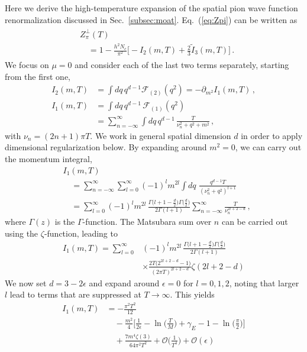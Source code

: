 \documentclass[reprint,english,superscriptaddress,preprintnumbers,amsmath,amssymb,aps,prd]{revtex4-2}
\def\Eq#1{Eq.~(\ref{#1})}
\def\Sec#1{Sec.~\ref{#1}}
\begin{document}
Here we derive the high-temperature expansion of the spatial pion wave function renormalization discussed in \Sec{subsec:moat}. \Eq{eq:Zpi} can be written as
%
\begin{align}
\begin{split}
&Z^\perp_\pi(T)\\[2ex]
&\quad =1-\frac{h^2N_c}{\pi^2}\bigg[-I_2(m,T)+\frac{2}{3}\tilde I_3(m,T)\bigg]
\,.
\label{eq:ZpiA}
\end{split}
\end{align}
%
We focus on $\mu=0$ and consider each of the last two terms separately, starting from the first one,
\begin{align}
 I_2(m,T) &= \int\! dq\,q^{d-1} \mathcal{F}_{(2)}(q^2) =  -\partial_{m^2} I_1(m,T)\,,\nonumber\\[2ex]
    I_1(m,T) &= \int\!dq\,q^{d-1}\,\mathcal{F}_{(1)}(q^2)\nonumber\\[2ex]
    &= \sum_{n=-\infty}^\infty \int\!dq\,q^{d-1}\, \frac{T}{\nu_n^2+q^2+m^2}\,,
    \label{eq:I2}
\end{align}
with $\nu_n = (2 n +1)\pi T$.
We work in general spatial dimension $d$ in order to apply dimensional regularization below. By expanding around $m^2 = 0$, we can carry out the momentum integral,
\begin{align}
    &I_1(m,T)\nonumber\\[2ex]
    &\quad= \sum_{n=-\infty}^\infty \sum_{l=0}^\infty (-1)^l m^{2l} \int\!dq\, \, \frac{q^{d-1} T}{(\nu_n^2+q^2)^{l+1}}\nonumber\\[2ex]
    &\quad=\sum_{l=0}^\infty (-1)^l m^{2l}\, \frac{\Gamma\big(l\!+\!1-\!\frac{d}{2}\big)\Gamma\big(\frac{d}{2}\big)}{2 \Gamma(l+1)}\! \sum_{n=-\infty}^\infty  \frac{T}{\nu_n^{2l+2-d}}\,,
\end{align}
where $\Gamma(z)$ is the $\Gamma$-function. The Matsubara sum over $n$ can be carried out using the $\zeta$-function, leading to
\begin{align}
  I_1(m,T) = \sum_{l=0}^\infty& (-1)^l m^{2l}\, \frac{\Gamma\big(l\!+\!1-\!\frac{d}{2}\big)\Gamma\big(\frac{d}{2}\big)}{2 \Gamma(l+1)}\nonumber\\[2ex]
  &\times\frac{2 T \big(2^{2l+2-d}-1\big)}{(2\pi T)^{2l+2-d}}\zeta(2l+2-d)
\end{align}
We now set $d=3-2\epsilon$ and expand around $\epsilon = 0$ for $l= 0,1,2$, noting that larger $l$ lead to terms that are suppressed at $T\rightarrow\infty$. This yields
\begin{align}
   I_1(m,T) &= -\frac{\pi^2 T^2}{12}\nonumber\\[2ex]
   &\quad-\frac{m^2}{4}\bigg[\frac{1}{2\epsilon}-\ln\bigg(\frac{T}{M}\bigg) + \gamma_E -1 -\ln\bigg(\!\frac{\pi}{2}\!\bigg)  \bigg]\nonumber\\[2ex]
   &\quad + \frac{7 m^4 \zeta(3)}{64\pi^2 T^2} + \mathcal{O}\bigg(\frac{1}{T^4}\bigg)
   + \mathcal{O}(\epsilon)
\end{align}
\end{document}
